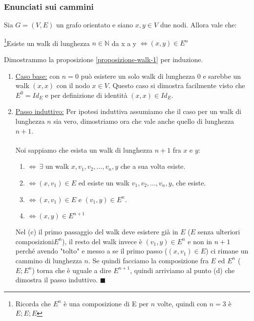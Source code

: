 \subsubsection{Enunciati sui cammini}
\begin{proposition}\label{proposizione-walk-1}
Sia $G = (V,E)$ un grafo orientato e siano $x,y \in V$ due nodi. Allora vale che:
\begin{center}
    \footnote{Ricorda che $E^n$ è una composizione di E per $n$ volte, quindi con $n=3$ è $E;E;E$}Esiste un walk di lunghezza $n\in \mathbb{N}$ da x a y $\Longleftrightarrow (x,y) \in E^n$
\end{center}
\end{proposition}
\begin{demostration}
Dimostrammo la proposizione \ref{proposizione-walk-1} per induzione.
\begin{enumerate}
    \item \underline{Caso base:} con $n=0$ può esistere un solo walk di lunghezza 0 e sarebbe un walk $(x,x)$ con il nodo $x \in V$. Questo caso si dimostra facilmente visto che $E^0 = Id_E$ e per definizione di identità $(x,x) \in Id_E$.
    \item \underline{Passo induttivo:} Per ipotesi induttiva assumiamo che il caso per un walk di lunghezza $n$ sia vero, dimostriamo ora che vale anche quello di lunghezza $n+1$. \\ \\
    Noi sappiamo che esista un walk di lunghezza $n + 1$ fra $x$ e $y$:
    \begin{enumerate}
        \item $\Longleftrightarrow \: \exists$ un walk $x, v_1, v_2, ..., v_n, y$ che a sua volta esiste.
        \item $\Longleftrightarrow (x, v_1) \in E$ ed esiste un walk $v_1, v_2, ..., v_n, y$, che esiste.
        \item $\Longleftrightarrow (x, v_1) \in E$ e $(v_1,y) \in E^n$.
        \item $\Longleftrightarrow (x,y) \in E^{n+1}$
    \end{enumerate}
    Nel (c) il primo passaggio del walk deve esistere già in $E$ ($E$ senza ulteriori composizioni$E^n$), il resto del walk invece è $(v_1,y) \in E^n$ e non in $n+1$ perché avendo "tolto" e messo a se il primo passo ($(x, v_1) \in E$) ci rimane un cammino di lunghezza $n$. Se quindi facciamo la composizione fra $E$ ed $E^n$ ($E;E^n$) torna che è uguale a dire $E^{n+1}$, quindi arriviamo al punto (d) che dimostra il passo induttivo. $\blacksquare$
\end{enumerate}
\end{demostration}

